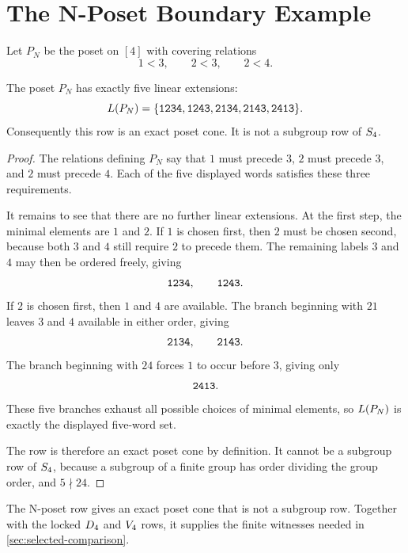 \section{The N-Poset Boundary Example}
\label{sec:n-poset}

\begin{example}
\label{ex:n-poset-row}
Let \(P_N\) be the poset on \([4]\) with covering relations
\[
  1<3,\qquad 2<3,\qquad 2<4.
\]
\end{example}

\begin{proposition}
\label{prop:n-poset-witness}
The poset \(P_N\) has exactly five linear extensions:
\[
  L(P_N)=\{\texttt{1234},\texttt{1243},\texttt{2134},\texttt{2143},\texttt{2413}\}.
\]
Consequently this row is an exact poset cone. It is not a subgroup row of \(S_4\).
\end{proposition}

\begin{proof}
The relations defining \(P_N\) say that \(1\) must precede \(3\), \(2\) must precede \(3\), and \(2\) must precede \(4\). Each of the five displayed words satisfies these three requirements.

It remains to see that there are no further linear extensions. At the first step, the minimal elements are \(1\) and \(2\). If \(1\) is chosen first, then \(2\) must be chosen second, because both \(3\) and \(4\) still require \(2\) to precede them. The remaining labels \(3\) and \(4\) may then be ordered freely, giving
\[
  \texttt{1234},\qquad \texttt{1243}.
\]
If \(2\) is chosen first, then \(1\) and \(4\) are available. The branch beginning with \(21\) leaves \(3\) and \(4\) available in either order, giving
\[
  \texttt{2134},\qquad \texttt{2143}.
\]
The branch beginning with \(24\) forces \(1\) to occur before \(3\), giving only
\[
  \texttt{2413}.
\]
These five branches exhaust all possible choices of minimal elements, so \(L(P_N)\) is exactly the displayed five-word set.

The row is therefore an exact poset cone by definition. It cannot be a subgroup row of \(S_4\), because a subgroup of a finite group has order dividing the group order, and \(5\nmid 24\).
\end{proof}

\begin{remark}
\label{rem:n-poset-role}
The N-poset row gives an exact poset cone that is not a subgroup row. Together with the locked \(D_4\) and \(V_4\) rows, it supplies the finite witnesses needed in \cref{sec:selected-comparison}.
\end{remark}